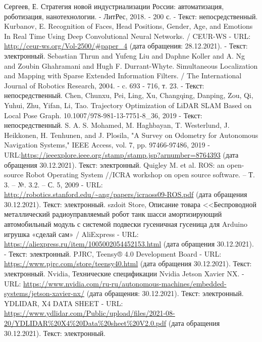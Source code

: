 \documentclass[12pt,a4paper]{scrartcl}
\begin{document}
		\newpage

	\begin{thebibliography}{13}
		 Сергеев, Е. Стратегия новой индустриализации России: автоматизация, роботизация, нанотехнологии. - ЛитРес, 2018. - 200 с. - Текст: непосредственный.
		 Kurbanov, E. Recognition of Faces, Head Positions, Gender, Age, and Emotions In Real Time Using Deep Convolutional Neural Networks. / CEUR-WS - URL: \url{http://ceur-ws.org/Vol-2500/#paper_4} (дата обращения: 28.12.2021). - Текст: электронный.
		 Sebastian Thrun and Yufeng Liu and Daphne Koller and A. Ng and Zoubin Ghahramani and Hugh F. Durrant-Whyte. Simultaneous Localization and Mapping with Sparse Extended Information Filters. / The International Journal of Robotics Research, 2004. - c. 693 - 716, т. 23. - Текст: непосредственный.
		 Chen, Chunxu, Pei, Ling, Xu, Changqing, Danping, Zou, Qi, Yuhui, Zhu, Yifan, Li, Tao. Trajectory Optimization of LiDAR SLAM Based on Local Pose Graph. 10.1007/978-981-13-7751-8\_36, 2019 - Текст: непосредственный.
		 S. A. S. Mohamed, M. Haghbayan, T. Westerlund, J. Heikkonen, H. Tenhunen, and J. Plosila, "A Survey on Odometry for Autonomous Navigation Systems," IEEE Access, vol. 7, pp. 97466-97486, 2019 - URL:\url{https://ieeexplore.ieee.org/stamp/stamp.jsp?arnumber=8764393} (дата обращения 30.12.2021). Текст: электронный.
		 Quigley M. et al. ROS: an open-source Robot Operating System //ICRA workshop on open source software. – Т. 3. – №. 3.2. – С. 5, 2009 - URL: \url{http://robotics.stanford.edu/~ang/papers/icraoss09-ROS.pdf} (дата обращения 30.12.2021). Текст: электронный.
		 szdoit Store, Описание товара <<Беспроводной металлический радиоуправляемый робот танк шасси амортизирующий автомобильный модуль с системой подвески гусеничная гусеница для Arduino игрушка «сделай сам» / AliExpress - URL: \url{https://aliexpress.ru/item/1005002054452153.html} (дата обращения 30.12.2021). - Текст: электронный.
		 PJRC, Teensy® 4.0 Development Board - URL: \url{https://www.pjrc.com/store/teensy40.html} (дата обращения 30.12.2021). Текст: электронный.
                 Nvidia, Технические спецификации Nvidia Jetson Xavier NX. - URL: \url{https://www.nvidia.com/ru-ru/autonomous-machines/embedded-systems/jetson-xavier-nx/} (дата обращения: 30.12.2021). Текст: электронный.
                 YDLIDAR, X4 DATA SHEET - URL: \url{https://www.ydlidar.com/Public/upload/files/2021-08-20/YDLIDAR%20X4%20Data%20sheet%20V2.0.pdf} (дата обращения 30.12.2021). Текст: электронный.

\end{thebibliography}
\end{document}
